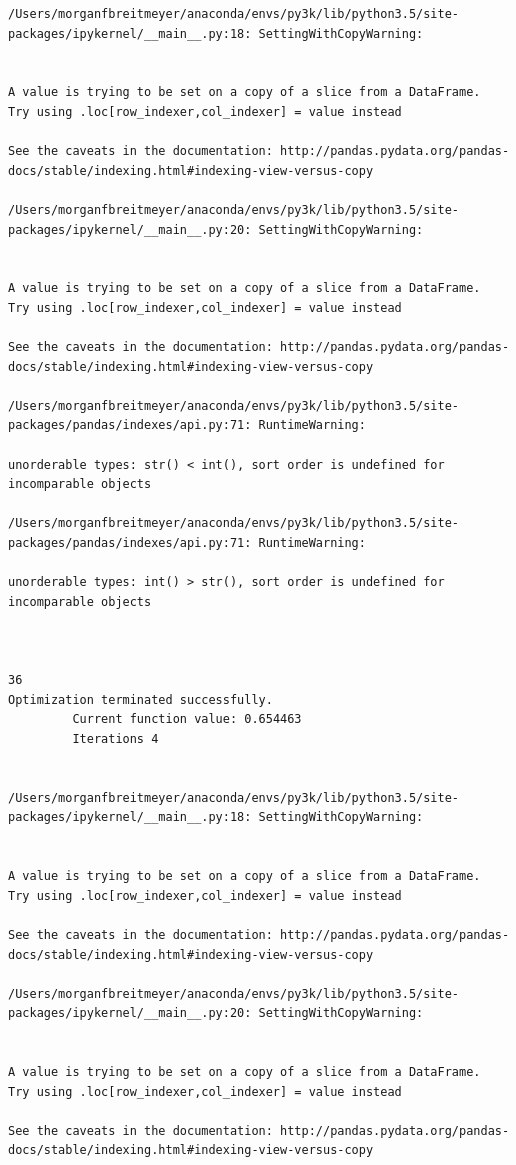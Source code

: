 \begin{lstlisting}
/Users/morganfbreitmeyer/anaconda/envs/py3k/lib/python3.5/site-packages/ipykernel/__main__.py:18: SettingWithCopyWarning:


A value is trying to be set on a copy of a slice from a DataFrame.
Try using .loc[row_indexer,col_indexer] = value instead

See the caveats in the documentation: http://pandas.pydata.org/pandas-docs/stable/indexing.html#indexing-view-versus-copy

/Users/morganfbreitmeyer/anaconda/envs/py3k/lib/python3.5/site-packages/ipykernel/__main__.py:20: SettingWithCopyWarning:


A value is trying to be set on a copy of a slice from a DataFrame.
Try using .loc[row_indexer,col_indexer] = value instead

See the caveats in the documentation: http://pandas.pydata.org/pandas-docs/stable/indexing.html#indexing-view-versus-copy

/Users/morganfbreitmeyer/anaconda/envs/py3k/lib/python3.5/site-packages/pandas/indexes/api.py:71: RuntimeWarning:

unorderable types: str() < int(), sort order is undefined for incomparable objects

/Users/morganfbreitmeyer/anaconda/envs/py3k/lib/python3.5/site-packages/pandas/indexes/api.py:71: RuntimeWarning:

unorderable types: int() > str(), sort order is undefined for incomparable objects



36
Optimization terminated successfully.
         Current function value: 0.654463
         Iterations 4


/Users/morganfbreitmeyer/anaconda/envs/py3k/lib/python3.5/site-packages/ipykernel/__main__.py:18: SettingWithCopyWarning:


A value is trying to be set on a copy of a slice from a DataFrame.
Try using .loc[row_indexer,col_indexer] = value instead

See the caveats in the documentation: http://pandas.pydata.org/pandas-docs/stable/indexing.html#indexing-view-versus-copy

/Users/morganfbreitmeyer/anaconda/envs/py3k/lib/python3.5/site-packages/ipykernel/__main__.py:20: SettingWithCopyWarning:


A value is trying to be set on a copy of a slice from a DataFrame.
Try using .loc[row_indexer,col_indexer] = value instead

See the caveats in the documentation: http://pandas.pydata.org/pandas-docs/stable/indexing.html#indexing-view-versus-copy


\end{lstlisting}
